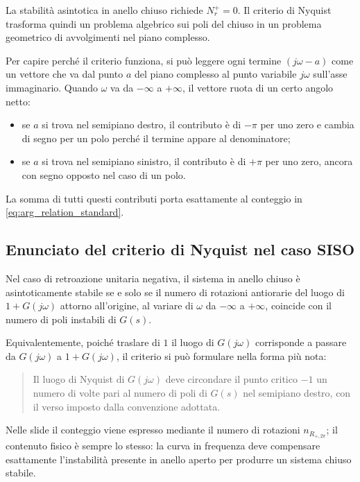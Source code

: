 \documentclass[11pt,a4paper]{article}
\begin{document}
\begin{keybox}
La stabilità asintotica in anello chiuso richiede $N_r^+=0$. Il criterio di Nyquist trasforma quindi un problema algebrico sui poli del chiuso in un problema geometrico di avvolgimenti nel piano complesso.
\end{keybox}

Per capire perché il criterio funziona, si può leggere ogni termine $(j\omega-a)$ come un vettore che va dal punto $a$ del piano complesso al punto variabile $j\omega$ sull’asse immaginario. Quando $\omega$ va da $-\infty$ a $+\infty$, il vettore ruota di un certo angolo netto:
\begin{itemize}
    \item se $a$ si trova nel semipiano destro, il contributo è di $-\pi$ per uno zero e cambia di segno per un polo perché il termine appare al denominatore;
    \item se $a$ si trova nel semipiano sinistro, il contributo è di $+\pi$ per uno zero, ancora con segno opposto nel caso di un polo.
\end{itemize}

La somma di tutti questi contributi porta esattamente al conteggio in \eqref{eq:arg_relation_standard}.

\subsection{Enunciato del criterio di Nyquist nel caso SISO}

Nel caso di retroazione unitaria negativa, il sistema in anello chiuso è asintoticamente stabile se e solo se il numero di rotazioni antiorarie del luogo di $1+G(j\omega)$ attorno all’origine, al variare di $\omega$ da $-\infty$ a $+\infty$, coincide con il numero di poli instabili di $G(s)$.

Equivalentemente, poiché traslare di $1$ il luogo di $G(j\omega)$ corrisponde a passare da $G(j\omega)$ a $1+G(j\omega)$, il criterio si può formulare nella forma più nota:
\begin{quote}
Il luogo di Nyquist di $G(j\omega)$ deve circondare il punto critico $-1$ un numero di volte pari al numero di poli di $G(s)$ nel semipiano destro, con il verso imposto dalla convenzione adottata.
\end{quote}

Nelle slide il conteggio viene espresso mediante il numero di rotazioni $n_{R_{+,2\pi}}$; il contenuto fisico è sempre lo stesso: la curva in frequenza deve compensare esattamente l’instabilità presente in anello aperto per produrre un sistema chiuso stabile.
\end{document}
